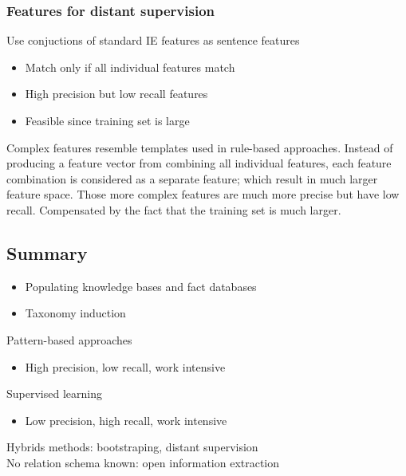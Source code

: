 \subsubsection{Features for distant supervision}
Use conjuctions of standard IE features as sentence features
\begin{itemize}
\item Match only if all individual features match
\item High precision but low recall features
\item Feasible since training set is large
\end{itemize}

Complex features resemble templates used in rule-based
approaches. Instead of producing a feature vector from combining all
individual features, each feature combination is considered as a
separate feature; which result in much larger feature space. Those
more complex features are much more precise but have low
recall. Compensated by the fact that the training set is much larger.

\subsection{Summary}
\begin{itemize}
\item Populating knowledge bases and fact databases
\item Taxonomy induction
\end{itemize}
Pattern-based approaches
\begin{itemize}
\item High precision, low recall, work intensive
\end{itemize}
Supervised learning
\begin{itemize}
\item Low precision, high recall, work intensive
\end{itemize}

Hybrids methods: bootstraping, distant supervision \\
No relation schema known: open information extraction

